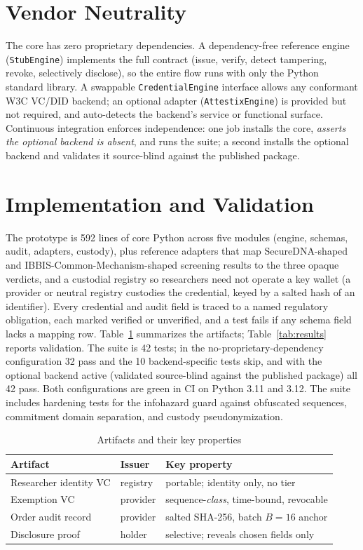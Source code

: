 \documentclass[conference]{IEEEtran}
\begin{document}
\section{Vendor Neutrality}
The core has zero proprietary dependencies. A dependency-free reference engine
(\texttt{StubEngine}) implements the full contract (issue, verify, detect tampering, revoke,
selectively disclose), so the entire flow runs with only the Python standard library. A
swappable \texttt{CredentialEngine} interface allows any conformant W3C VC/DID backend; an
optional adapter (\texttt{AttestixEngine}) is provided but not required, and auto-detects the
backend's service or functional surface. Continuous integration enforces independence: one job
installs the core, \textit{asserts the optional backend is absent}, and runs the suite; a second
installs the optional backend and validates it source-blind against the published package.

\section{Implementation and Validation}
The prototype is 592 lines of core Python across five modules (engine, schemas, audit, adapters,
custody), plus reference adapters that map SecureDNA-shaped and IBBIS-Common-Mechanism-shaped
screening results to the three opaque verdicts, and a custodial registry so researchers need not
operate a key wallet (a provider or neutral registry custodies the credential, keyed by a
salted hash of an identifier). Every credential and audit field is traced to a named regulatory
obligation, each marked verified or unverified, and a test fails if any schema field lacks a
mapping row. Table~\ref{tab:artifacts} summarizes the artifacts; Table~\ref{tab:results} reports
validation. The suite is 42 tests; in the no-proprietary-dependency configuration 32 pass and
the 10 backend-specific tests skip, and with the optional backend active (validated source-blind
against the published package) all 42 pass. Both configurations are green in CI on Python 3.11
and 3.12. The suite includes hardening tests for the infohazard guard against obfuscated
sequences, commitment domain separation, and custody pseudonymization.

\begin{table}[t]
\caption{Artifacts and their key properties}
\label{tab:artifacts}
\centering
\renewcommand{\arraystretch}{1.2}
\begin{tabular}{@{}lll@{}}
\toprule
\textbf{Artifact} & \textbf{Issuer} & \textbf{Key property} \\
\midrule
Researcher identity VC & registry & portable; identity only, no tier \\
Exemption VC & provider & sequence-\textit{class}, time-bound, revocable \\
Order audit record & provider & salted SHA-256, batch $B{=}16$ anchor \\
Disclosure proof & holder & selective; reveals chosen fields only \\
\bottomrule
\end{tabular}
\end{table}
\end{document}
